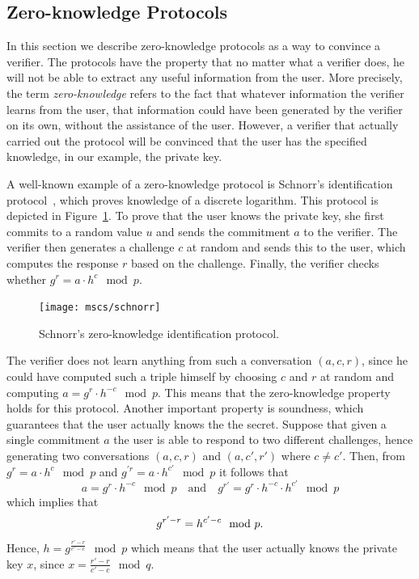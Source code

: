 \subsection{Zero-knowledge Protocols}

In this section we describe zero-knowledge protocols as a way to convince a
verifier. The protocols have the property that no matter what a verifier does,
he will not be able to extract any useful information from the user. More
precisely, the term \emph{zero-knowledge} refers to the fact that whatever
information the verifier learns from the user, that information could have been
generated by the verifier on its own, without the assistance of the user.
However, a verifier that actually carried out the protocol will be convinced
that the user has the specified knowledge, in our example, the private key.

A well-known example of a zero-knowledge protocol is Schnorr's identification
protocol~\cite{Schnorr1991}, which proves knowledge of a discrete logarithm.
This protocol is depicted in Figure~\ref{msc:schnorr}. To prove that the user
knows the private key, she first commits to a random value $u$ and sends the
commitment $a$ to the verifier. The verifier then generates a challenge $c$ at
random and sends this to the user, which computes the response $r$ based on the
challenge. Finally, the verifier checks whether $g^r = a \cdot h^c \mod p$.

\begin{figure}[ht]
  \centering
  \texttt{[image: mscs/schnorr]}
  \caption{Schnorr's zero-knowledge identification protocol.}
  \label{msc:schnorr}
\end{figure}


The verifier does not learn anything from such a conversation $(a, c, r)$, since
he could have computed such a triple himself by choosing $c$ and $r$ at random
and computing $a = g^r \cdot h^{-c} \mod p$. This means that the zero-knowledge
property holds for this protocol. Another important property is soundness, which
guarantees that the user actually knows the the secret. Suppose that given a
single commitment $a$ the user is able to respond to two different challenges,
hence generating two conversations $(a, c, r)$ and $(a, c', r')$ where
$c \neq c'$. Then, from $g^r = a \cdot h^c \mod p$ and
$g^{'r} = a \cdot h^{c'} \mod p$ it follows that
\begin{equation*}
  a = g^r \cdot h^{-c} \mod p
  \quad\text{and}\quad
  g^{r'} = g^r \cdot h^{-c} \cdot h^{c'} \mod p
\end{equation*}
which implies that
\begin{equation*}
  g^{r'-r} = h^{c'-c} \mod p\text.
\end{equation*}
Hence, $h = g^{\frac{r'-r}{c'-c}} \mod p$ which means that the user actually
knows the private key $x$, since $x = \frac{r'-r}{c'-c} \mod q$.

